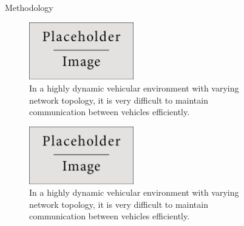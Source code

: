 \documentclass[final]{beamer}
\newlength{\sepwid}
\newlength{\onecolwid}
\newlength{\twocolwid}
\begin{document}
\begin{frame}[t]
\begin{columns}[t]
\begin{column}{\onecolwid}
\end{column} %

\begin{column}{\sepwid}\end{column} %

\begin{column}{\twocolwid} %

\begin{columns}[t,totalwidth=\twocolwid] %

\begin{column}{\onecolwid}\vspace{-1.3in} %


\begin{block}{Methodology}
\begin{multicols}{2}
\begin{figure}
\centering
\includegraphics[width=0.45\textwidth,keepaspectratio]{placeholder.jpg}
\caption{In a highly dynamic vehicular environment with varying network topology, it is very difficult to maintain communication between vehicles efficiently.}
\end{figure}
\begin{figure}
\centering
\includegraphics[width=0.45\textwidth,keepaspectratio]{placeholder.jpg}
\caption{In a highly dynamic vehicular environment with varying network topology, it is very difficult to maintain communication between vehicles efficiently.}
\end{figure}
\end{multicols}
\end{block}


\end{column}
\end{columns}
\end{column}
\end{columns}
\end{frame}
\end{document}
